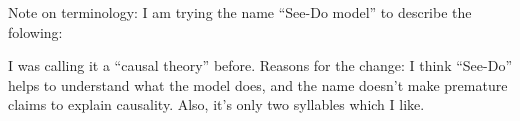 
Note on terminology: I am trying the name ``See-Do model'' to describe the folowing:


I was calling it a ``causal theory'' before. Reasons for the change: I think ``See-Do'' helps to understand what the model does, and the name doesn't make premature claims to explain causality. Also, it's only two syllables which I like.